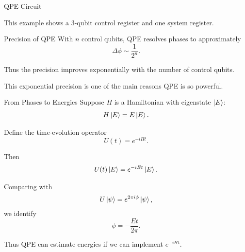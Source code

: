 \documentclass{beamer}
\begin{document}
\begin{frame}{QPE Circuit}
\centering
{}

\vspace{0.5em}

This example shows a 3-qubit control register and one system register.
\end{frame}


\begin{frame}{Precision of QPE}
With \(n\) control qubits, QPE resolves phases to approximately
\[
\Delta \phi \sim \frac{1}{2^n}.
\]

Thus the precision improves exponentially with the number of control qubits.

This exponential precision is one of the main reasons QPE is so powerful.
\end{frame}

\begin{frame}{From Phases to Energies}
Suppose \(H\) is a Hamiltonian with eigenstate \(\ket{E}\):
\[
H\ket{E} = E\ket{E}.
\]

Define the time-evolution operator
\[
U(t)=e^{-iHt}.
\]

Then
\[
U(t)\ket{E} = e^{-iEt}\ket{E}.
\]

Comparing with
\[
U\ket{\psi}=e^{2\pi i \phi}\ket{\psi},
\]
we identify
\[
\phi = -\frac{Et}{2\pi}.
\]

Thus QPE can estimate energies if we can implement \(e^{-iHt}\).
\end{frame}
\end{document}
